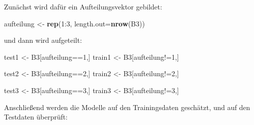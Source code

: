 \documentclass[12pt,]{book}
\newenvironment{Shaded}{\begin{snugshade}}{\end{snugshade}}
\newcommand{\KeywordTok}[1]{\textcolor[rgb]{0.13,0.29,0.53}{\textbf{{#1}}}}
\newcommand{\DataTypeTok}[1]{\textcolor[rgb]{0.13,0.29,0.53}{{#1}}}
\newcommand{\DecValTok}[1]{\textcolor[rgb]{0.00,0.00,0.81}{{#1}}}
\newcommand{\StringTok}[1]{\textcolor[rgb]{0.31,0.60,0.02}{{#1}}}
\newcommand{\NormalTok}[1]{{#1}}
\begin{document}
Zunächst wird dafür ein Aufteilungsvektor gebildet:

\begin{Shaded}
\begin{Highlighting}[]
\NormalTok{aufteilung <-}\StringTok{ }\KeywordTok{rep}\NormalTok{(}\DecValTok{1}\NormalTok{:}\DecValTok{3}\NormalTok{, }\DataTypeTok{length.out=}\KeywordTok{nrow}\NormalTok{(B3))}
\end{Highlighting}
\end{Shaded}

und dann wird aufgeteilt:

\begin{Shaded}
\begin{Highlighting}[]
\NormalTok{test1 <-}\StringTok{ }\NormalTok{B3[aufteilung==}\DecValTok{1}\NormalTok{,]}
\NormalTok{train1 <-}\StringTok{ }\NormalTok{B3[aufteilung!=}\DecValTok{1}\NormalTok{,]}

\NormalTok{test2 <-}\StringTok{ }\NormalTok{B3[aufteilung==}\DecValTok{2}\NormalTok{,]}
\NormalTok{train2 <-}\StringTok{ }\NormalTok{B3[aufteilung!=}\DecValTok{2}\NormalTok{,]}

\NormalTok{test3 <-}\StringTok{ }\NormalTok{B3[aufteilung==}\DecValTok{3}\NormalTok{,]}
\NormalTok{train3 <-}\StringTok{ }\NormalTok{B3[aufteilung!=}\DecValTok{3}\NormalTok{,]}
\end{Highlighting}
\end{Shaded}

Anschließend werden die Modelle auf den Trainingsdaten geschätzt, und
auf den Testdaten überprüft:
\end{document}
